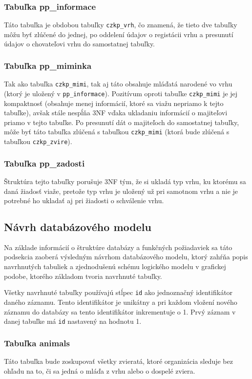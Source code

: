 \subsubsection{Tabuľka pp\_informace}
Táto tabuľka je obdobou tabuľky \texttt{czkp_vrh}, čo znamená, že tieto dve tabuľky môžu byť zlúčené do jednej, po oddelení údajov o registácii vrhu a presunutí údajov o chovateľovi vrhu do samostatnej tabuľky.

\subsubsection{Tabuľka pp\_miminka}
Tak ako tabuľka \texttt{czkp_mimi}, tak aj táto obsahuje mláďatá narodené vo vrhu (ktorý je uložený v \texttt{pp_informace}). Pozitívum oproti tabuľke \texttt{czkp_mimi} je jej kompaktnosť (obsahuje menej informácií, ktoré sa viažu nepriamo k tejto tabuľke), avšak stále nespĺňa 3NF vďaka ukladaniu informácií o majiteľovi priamo v tejto tabuľke. Po presunutí dát o majiteľoch do samostatnej tabuľky, môže byť táto tabuľka zlúčená s tabuľkou \texttt{czkp_mimi} (ktorá bude zlúčená s tabuľkou \texttt{czkp_zvire}).

\subsubsection{Tabuľka pp\_zadosti}
Štruktúra tejto tabuľky porušuje 3NF tým, že si ukladá typ vrhu, ku ktorému sa daná žiadosť viaže, pretože typ vrhu je uložený 
už pri samotnom vrhu a nie je potrebné ho ukladať aj pri žiadosti o schválenie vrhu.

\subsection{Návrh databázového modelu}
Na základe informácií o štruktúre databázy a funkčných požiadaviek sa táto podsekcia zaoberá výsledným návrhom databázového modelu, ktorý zahŕňa popis navrhnutých tabuliek a zjednodušenú schému logického modelu v grafickej podobe, ktorého základom tvoria navrhnuté tabuľky.


Všetky navrhnuté tabuľky používajú stĺpec \texttt{id} ako jednoznačný identifikátor daného záznamu.
Tento identifikátor je unikátny a pri každom vložení nového záznamu do databázy sa tento identifikátor inkrementuje o 1.
Prvý záznam v danej tabuľke má \texttt{id} nastavený na hodnotu 1.

\subsubsection{Tabuľka animals}\label{tabulka-animals}
Táto tabuľka bude zoskupovať všetky zvieratá, ktoré organizácia sleduje bez ohľadu na to, či sa jedná o mláďa z vrhu alebo o dospelé zviera. 

